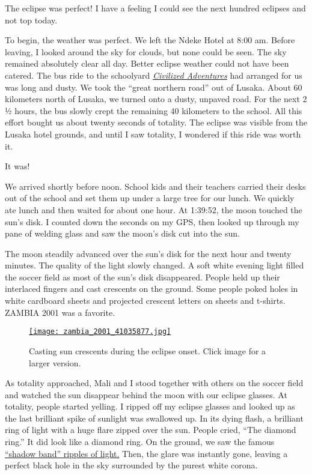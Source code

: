 The eclipse was perfect! I have a feeling I could see the next hundred
eclipses and not top today.

To begin, the weather was perfect. We left the Ndeke Hotel at 8:00 am.
Before leaving, I looked around the sky for clouds, but none could be
seen. The sky remained absolutely clear all day. Better eclipse weather
could not have been catered. The bus ride to the schoolyard
\emph{\href{https://ca.linkedin.com/company/civilized-adventures}{Civilized
Adventures}} had arranged for us was long and dusty. We took the ``great
northern road'' out of Lusaka. About 60 kilometers north of Lusaka, we
turned onto a dusty, unpaved road. For the next 2 ½ hours, the bus
slowly crept the remaining 40 kilometers to the school. All this effort
bought us about twenty seconds of totality. The eclipse was visible from
the Lusaka hotel grounds, and until I saw totality, I wondered if this
ride was worth it.

It was!

We arrived shortly before noon. School kids and their teachers carried
their desks out of the school and set them up under a large tree for our
lunch. We quickly ate lunch and then waited for about one hour. At
1:39:52, the moon touched the sun's disk. I counted down the seconds on
my GPS, then looked up through my pane of welding glass and saw the
moon's disk cut into the sun.

The moon steadily advanced over the sun's disk for the next hour and
twenty minutes. The quality of the light slowly changed. A soft white
evening light filled the soccer field as most of the sun's disk
disappeared. People held up their interlaced fingers and cast crescents
on the ground. Some people poked holes in white cardboard sheets and
projected crescent letters on sheets and t-shirts. ZAMBIA 2001 was a
favorite.

\begin{SCfigure}
\centering
\href{https://conceptcontrol.smugmug.com/Trips/Overseas/Zambia-Eclipse-Trip-1/i-Zx8CXwz/A}{\texttt{[image: zambia\_2001\_41035877.jpg]}}
\caption{Casting sun crescents during the eclipse onset. Click image for a
larger version.}
\label{fig:8074X1}
\end{SCfigure}

As totality approached, Mali and I stood together with others on the
soccer field and watched the sun disappear behind the moon with our
eclipse glasses. At totality, people started yelling. I ripped off my
eclipse glasses and looked up as the last brilliant spike of sunlight
was swallowed up. In its dying flash, a brilliant ring of light with a
huge flare zipped over the sun. People cried, ``The diamond ring.'' It
did look like a diamond ring. On the ground, we saw the famous \href{https://en.wikipedia.org/wiki/Shadow_bands}{``shadow band'' ripples of light.} Then, the glare was instantly gone, leaving
a perfect black hole in the sky surrounded by the purest white
corona.

